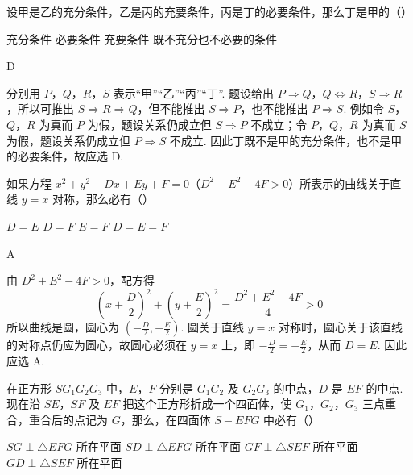 \documentclass[UTF8,a4paper,oneside,11pt]{ctexbook}
\begin{document}
\begin{problem}

设甲是乙的充分条件，乙是丙的充要条件，丙是丁的必要条件，那么丁是甲的（\quad）

\choices
    {充分条件}
    {必要条件}
    {充要条件}
    {既不充分也不必要的条件}
\end{problem}

\begin{answer}
D
\end{answer}

\begin{solution}
分别用 \(P\)，\(Q\)，\(R\)，\(S\) 表示“甲”“乙”“丙”“丁”. 题设给出 \(P\Rightarrow Q\)，\(Q\Leftrightarrow R\)，\(S\Rightarrow R\)，所以可推出 \(S\Rightarrow R\Rightarrow Q\)，但不能推出 \(S\Rightarrow P\)，也不能推出 \(P\Rightarrow S\). 例如令 \(S\)，\(Q\)，\(R\) 为真而 \(P\) 为假，题设关系仍成立但 \(S\Rightarrow P\) 不成立；令 \(P\)，\(Q\)，\(R\) 为真而 \(S\) 为假，题设关系仍成立但 \(P\Rightarrow S\) 不成立. 因此丁既不是甲的充分条件，也不是甲的必要条件，故应选 D.
\end{solution}

\begin{problem}

如果方程 \(x^2 + y^2 + Dx + Ey + F = 0\)（\(D^2 + E^2 - 4F > 0\)）所表示的曲线关于直线 \(y = x\) 对称，那么必有（\quad）

\choices
    {\(D = E\)}
    {\(D = F\)}
    {\(E = F\)}
    {\(D = E = F\)}
\end{problem}

\begin{answer}
A
\end{answer}

\begin{solution}
由 \(D^2+E^2-4F>0\)，配方得
\[
\left(x+\frac{D}{2}\right)^2+\left(y+\frac{E}{2}\right)^2=\frac{D^2+E^2-4F}{4}>0
\]
所以曲线是圆，圆心为 \((-\frac{D}{2},-\frac{E}{2})\). 圆关于直线 \(y=x\) 对称时，圆心关于该直线的对称点仍应为圆心，故圆心必须在 \(y=x\) 上，即 \(-\frac{D}{2}=-\frac{E}{2}\)，从而 \(D=E\). 因此应选 A.
\end{solution}

\begin{problem}

在正方形 \(SG_1G_2G_3\) 中，\(E\)，\(F\) 分别是 \(G_1G_2\) 及 \(G_2G_3\) 的中点，\(D\) 是 \(EF\) 的中点. 现在沿 \(SE\)，\(SF\) 及 \(EF\) 把这个正方形折成一个四面体，使 \(G_1\)，\(G_2\)，\(G_3\) 三点重合，重合后的点记为 \(G\)，那么，在四面体 \(S - EFG\) 中必有（\quad）


\choices
    {\(SG \perp \triangle EFG\) 所在平面}
    {\(SD \perp \triangle EFG\) 所在平面}
    {\(GF \perp \triangle SEF\) 所在平面}
    {\(GD \perp \triangle SEF\) 所在平面}
\end{problem}
\end{document}

